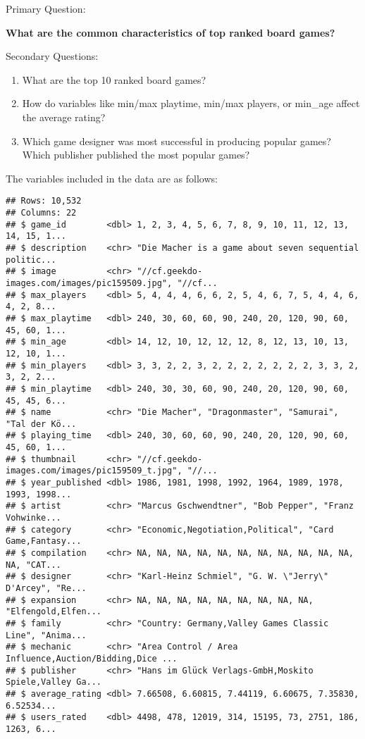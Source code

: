 \documentclass[
]{article}
\providecommand{\tightlist}{%
  \setlength{\itemsep}{0pt}\setlength{\parskip}{0pt}}
\begin{document}
Primary Question:

\textbf{What are the common characteristics of top ranked board games?}

Secondary Questions:

\begin{enumerate}
\def\labelenumi{\arabic{enumi}.}
\tightlist
\item
  What are the top 10 ranked board games?
\item
  How do variables like min/max playtime, min/max players, or min\_age affect the average rating?
\item
  Which game designer was most successful in producing popular games? Which publisher published the most popular games?
\end{enumerate}

The variables included in the data are as follows:

\begin{verbatim}
## Rows: 10,532
## Columns: 22
## $ game_id        <dbl> 1, 2, 3, 4, 5, 6, 7, 8, 9, 10, 11, 12, 13, 14, 15, 1...
## $ description    <chr> "Die Macher is a game about seven sequential politic...
## $ image          <chr> "//cf.geekdo-images.com/images/pic159509.jpg", "//cf...
## $ max_players    <dbl> 5, 4, 4, 4, 6, 6, 2, 5, 4, 6, 7, 5, 4, 4, 6, 4, 2, 8...
## $ max_playtime   <dbl> 240, 30, 60, 60, 90, 240, 20, 120, 90, 60, 45, 60, 1...
## $ min_age        <dbl> 14, 12, 10, 12, 12, 12, 8, 12, 13, 10, 13, 12, 10, 1...
## $ min_players    <dbl> 3, 3, 2, 2, 3, 2, 2, 2, 2, 2, 2, 2, 3, 3, 2, 3, 2, 2...
## $ min_playtime   <dbl> 240, 30, 30, 60, 90, 240, 20, 120, 90, 60, 45, 45, 6...
## $ name           <chr> "Die Macher", "Dragonmaster", "Samurai", "Tal der Kö...
## $ playing_time   <dbl> 240, 30, 60, 60, 90, 240, 20, 120, 90, 60, 45, 60, 1...
## $ thumbnail      <chr> "//cf.geekdo-images.com/images/pic159509_t.jpg", "//...
## $ year_published <dbl> 1986, 1981, 1998, 1992, 1964, 1989, 1978, 1993, 1998...
## $ artist         <chr> "Marcus Gschwendtner", "Bob Pepper", "Franz Vohwinke...
## $ category       <chr> "Economic,Negotiation,Political", "Card Game,Fantasy...
## $ compilation    <chr> NA, NA, NA, NA, NA, NA, NA, NA, NA, NA, NA, NA, "CAT...
## $ designer       <chr> "Karl-Heinz Schmiel", "G. W. \"Jerry\" D'Arcey", "Re...
## $ expansion      <chr> NA, NA, NA, NA, NA, NA, NA, NA, NA, "Elfengold,Elfen...
## $ family         <chr> "Country: Germany,Valley Games Classic Line", "Anima...
## $ mechanic       <chr> "Area Control / Area Influence,Auction/Bidding,Dice ...
## $ publisher      <chr> "Hans im Glück Verlags-GmbH,Moskito Spiele,Valley Ga...
## $ average_rating <dbl> 7.66508, 6.60815, 7.44119, 6.60675, 7.35830, 6.52534...
## $ users_rated    <dbl> 4498, 478, 12019, 314, 15195, 73, 2751, 186, 1263, 6...
\end{verbatim}
\end{document}
